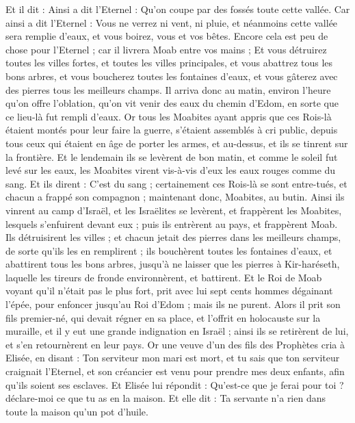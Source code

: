 \begin{multicols}{2}
Et il dit : Ainsi a dit l'Eternel : Qu'on coupe par des fossés toute cette vallée.
Car ainsi a dit l'Eternel : Vous ne verrez ni vent, ni pluie, et néanmoins cette vallée sera remplie d'eaux, et vous boirez, vous et vos bêtes.
Encore cela est peu de chose pour l'Eternel ; car il livrera Moab entre vos mains ;
Et vous détruirez toutes les villes fortes, et toutes les villes principales, et vous abattrez tous les bons arbres, et vous boucherez toutes les fontaines d'eaux, et vous gâterez avec des pierres tous les meilleurs champs.
Il arriva donc au matin, environ l'heure qu'on offre l'oblation, qu'on vit venir des eaux du chemin d'Edom, en sorte que ce lieu-là fut rempli d'eaux.
Or tous les Moabites ayant appris que ces Rois-là étaient montés pour leur faire la guerre, s'étaient assemblés à cri public, depuis tous ceux qui étaient en âge de porter les armes, et au-dessus, et ils se tinrent sur la frontière.
Et le lendemain ils se levèrent de bon matin, et comme le soleil fut levé sur les eaux, les Moabites virent vis-à-vis d'eux les eaux rouges comme du sang.
Et ils dirent : C'est du sang ; certainement ces Rois-là se sont entre-tués, et chacun a frappé son compagnon ; maintenant donc, Moabites, au butin.
Ainsi ils vinrent au camp d'Israël, et les Israëlites se levèrent, et frappèrent les Moabites, lesquels s'enfuirent devant eux ; puis ils entrèrent au pays, et frappèrent Moab.
Ils détruisirent les villes ; et chacun jetait des pierres dans les meilleurs champs, de sorte qu'ils les en remplirent ; ils bouchèrent toutes les fontaines d'eaux, et abattirent tous les bons arbres, jusqu'à ne laisser que les pierres à Kir-haréseth, laquelle les tireurs de fronde environnèrent, et battirent.
Et le Roi de Moab voyant qu'il n'était pas le plus fort, prit avec lui sept cents hommes dégainant l'épée, pour enfoncer jusqu'au Roi d'Edom ; mais ils ne purent.
Alors il prit son fils premier-né, qui devait régner en sa place, et l'offrit en holocauste sur la muraille, et il y eut une grande indignation en Israël ; ainsi ils se retirèrent de lui, et s'en retournèrent en leur pays.
\VerseOne{}Or une veuve d'un des fils des Prophètes cria à Elisée, en disant : Ton serviteur mon mari est mort, et tu sais que ton serviteur craignait l'Eternel, et son créancier est venu pour prendre mes deux enfants, afin qu'ils soient ses esclaves.
Et Elisée lui répondit : Qu'est-ce que je ferai pour toi ? déclare-moi ce que tu as en la maison. Et elle dit : Ta servante n'a rien dans toute la maison qu'un pot d'huile.

\end{multicols}
